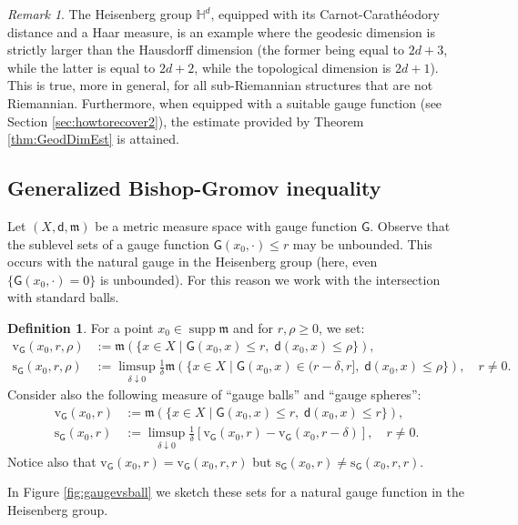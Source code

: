 \documentclass[11pt,a4paper]{article}
\theoremstyle{plain}
\theoremstyle{definition}
\newtheorem{definition}[theorem]{Definition}
\theoremstyle{remark}
\newtheorem{remark}[theorem]{Remark}
\numberwithin{equation}{section}
\DeclareMathOperator{\supp}{\mathrm{supp}}
\newcommand{\rv}{\mathrm{v}}
\newcommand{\rs}{\mathrm{s}}
\newcommand{\mm}{\mathfrak m}
\newcommand{\sfd}{\mathsf d}
\newcommand{\sfG}{\mathsf G}
\begin{document}
\begin{remark}\label{rmk:sharpnessgeodim}
The Heisenberg group $\mathbb{H}^{d}$, equipped with its Carnot-Carath\'eodory distance and a Haar measure, is an example where the geodesic dimension is strictly larger than the Hausdorff dimension (the former being equal to $2d+3$, while the latter is equal to $2d+2$, while the topological dimension is $2d+1$). This is true, more in general, for all sub-Riemannian structures that are not Riemannian. Furthermore, when equipped with a suitable gauge function (see Section \ref{sec:howtorecover2}), the estimate provided by Theorem \ref{thm:GeodDimEst} is attained.
\end{remark}

\subsection{Generalized Bishop-Gromov inequality}\label{s:GBGI}

Let $(X,\sfd,\mm)$ be a  metric measure space with gauge function $\sfG$.  Observe that the sublevel sets of a gauge function $\sfG(x_0,\cdot) \leq r$ may be unbounded. This occurs with  the natural gauge in the Heisenberg group (here, even $\{\sfG(x_0,\cdot) = 0\}$ is unbounded). For this reason we work with the intersection with standard balls. 

\begin{definition}\label{def:gaugesets}
For a point $x_{0}\in \supp \mm$ and for $r,\rho\geq 0$, we set:
\begin{align}
\rv_{\sfG}(x_0,r,\rho)& :=\mm\left(\{x\in X \mid \sfG(x_0,x)\leq r,\;  \sfd(x_0,x)\leq \rho\}\right), \\
\rs_{\sfG}(x_0,r,\rho)& :=\limsup_{\delta\downarrow 0}\frac{1}{\delta} \mm\left(\{x\in X\mid \sfG(x_0,x)\in (r-\delta,r],\; \sfd(x_0,x)\leq \rho\}\right), \quad r\neq 0.
\end{align}
Consider also the following measure of ``gauge balls'' and ``gauge spheres'':
\begin{align}
\rv_{\sfG}(x_0,r) & :=  \mm\left( \{ x\in X \mid \sfG(x_0,x)\leq r,\; \sfd(x_0,x)\leq r\}\right), \label{eq:defvGr} \\
\rs_{\sfG}(x_0,r) & := \limsup_{\delta\downarrow 0}\frac{1}{\delta}\left[\rv_{\sfG}(x_0,r)-\rv_{\sfG}(x_0,r-\delta)\right], \quad r\neq 0. \label{eq:defsGr}
\end{align}
Notice also that $\rv_{\sfG}(x_0,r) = \rv_{\sfG}(x_0,r,r)$ but $\rs_{\sfG}(x_0,r) \neq \rs_{\sfG}(x_0,r,r)$. 
\end{definition}
In Figure \ref{fig:gaugevsball} we sketch these sets for a natural gauge function in the Heisenberg group. 
\end{document}
